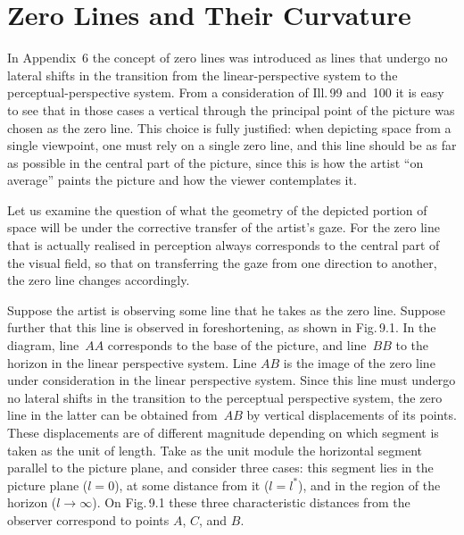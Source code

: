 
\chapter{Zero Lines and Their Curvature}


In Appendix~6 the concept of zero lines was introduced as lines that undergo no lateral
shifts in the transition from the linear-perspective system to the perceptual-perspective
system.  From a consideration of Ill.\,99 and~100 it is easy to see that in those cases
a vertical through the principal point of the picture was chosen as the zero line.  This
choice is fully justified: when depicting space from a single viewpoint, one must rely on
a single zero line, and this line should be as far as possible in the central part of the
picture, since this is how the artist ``on average'' paints the picture and how the viewer
contemplates it.

Let us examine the question of what the geometry of the depicted portion of space will be
under the corrective transfer of the artist's gaze.  For the zero line that is actually
realised in perception always corresponds to the central part of the visual field, so that
on transferring the gaze from one direction to another, the zero line changes accordingly.

Suppose the artist is observing some line that he takes as the zero line.  Suppose further
that this line is observed in foreshortening, as shown in Fig.\,9.1.  In the diagram,
line~$AA$ corresponds to the base of the picture, and line~$BB$ to the horizon in the
linear perspective system.  Line $AB$ is the image of the zero line under consideration
in the linear perspective system.  Since this line must undergo no lateral shifts in the
transition to the perceptual perspective system, the zero line in the latter can be
obtained from~$AB$ by vertical displacements of its points.  These displacements are of
different magnitude depending on which segment is taken as the unit of length.  Take as
the unit module the horizontal segment parallel to the picture plane, and consider three
cases: this segment lies in the picture plane ($l = 0$), at some distance from it
($l = l^*$), and in the region of the horizon ($l \to \infty$).  On Fig.\,9.1 these three
characteristic distances from the observer correspond to points $A$, $C$, and $B$.


